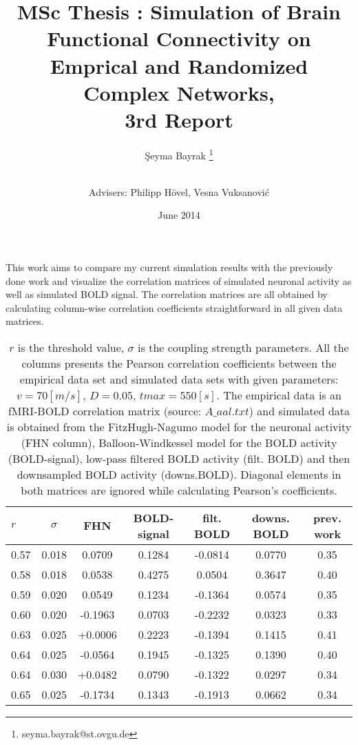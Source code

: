 \documentclass[12pt]{article}
\title{MSc Thesis : Simulation of Brain Functional Connectivity on Emprical and Randomized Complex Networks, \\ 3rd Report}
\author[1]{\c{S}eyma Bayrak \thanks{seyma.bayrak@st.ovgu.de}}
\author[ ]{\\ Advisers: Philipp H\"{o}vel, Vesna Vuksanovi\'c}
\affil[1]{\footnotesize{Integrative Neuroscience MSc, Otto von Guericke University, Magdeburg}}
\date{June 2014}
\begin{document}
   \maketitle
This work aims to compare my current simulation results with the previously done work and visualize the correlation matrices of simulated neuronal activity as well as simulated BOLD signal. The correlation matrices are all obtained by calculating column-wise correlation coefficients straightforward in all given data matrices. 

\newpage

\begin{table}[h]
		\caption{$r$ is the threshold value, $\sigma$ is the coupling strength parameters. All the columns presents the Pearson correlation coefficients between the empirical data set and simulated data sets with given parameters: $v=70[m/s]$, $D=0.05$, $tmax=550[s]$. The empirical data is an fMRI-BOLD correlation matrix (source: $A\_aal.txt$) and simulated data is obtained from the FitzHugh-Nagumo model for the neuronal activity (FHN column), Balloon-Windkessel model for the BOLD activity (BOLD-signal), low-pass filtered BOLD activity (filt. BOLD) and then downsampled BOLD activity (downs.BOLD). Diagonal elements in both matrices are ignored while calculating Pearson's coefficients. 	}
	\begin{tabular}{l | c | c | c | c | c | c } \hline
$r$  &  $\sigma$ & FHN     & BOLD-signal & filt. BOLD    & downs. BOLD & prev. work  \\ \hline \hline
0.57 &  0.018 	 & 0.0709  &	0.1284	 &	-0.0814		 &	0.0770	   & 0.35   	    \\ \hline
0.58 &  0.018    & 0.0538  &	0.4275	 &	0.0504		 &	0.3647	   & 0.40			\\ \hline
0.59 &  0.020    & 0.0549  &	0.1234	 &	-0.1364		 &	0.0574	   & 0.35			\\ \hline
0.60 &  0.020    & -0.1963 &	0.0703	 &	-0.2232		 &	0.0323	   & 0.33			\\ \hline
0.63 &  0.025    & +0.0006 &	0.2223	 &	-0.1394		 &	0.1415	   & 0.41			\\ \hline
0.64 &  0.025    & -0.0564 &	0.1945	 &	-0.1325		 &	0.1390	   & 0.40			\\ \hline
0.64 &  0.030    & +0.0482 &	0.0790	 &	-0.1322		 &	0.0297	   & 0.34			\\ \hline
0.65 &  0.025    & -0.1734 &	0.1343	 &	-0.1913		 &	0.0662	   & 0.34    		\\ \hline
	\end{tabular}  
\end{table}    
\end{document}
